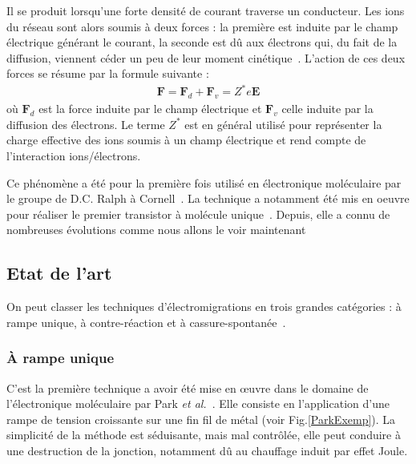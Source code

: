 Il se produit lorsqu'une forte densité de courant traverse un conducteur. Les ions du réseau sont alors soumis à deux forces : la première est induite par le champ électrique générant le courant, la seconde est d\^u aux électrons qui, du fait de la diffusion, viennent céder un peu de leur moment cinétique~\cite{Ho1989}. L'action de ces deux forces se résume par la formule suivante :
\begin{eqnarray}
\textbf{F} = \textbf{F}_d + \textbf{F}_v = Z^*e\textbf{E} \nonumber
\end{eqnarray}
où $\textbf{F}_d$ est la force induite par le champ électrique et $\textbf{F}_v$ celle induite par la diffusion des électrons. Le terme $Z^*$ est en général utilisé pour représenter la charge effective des ions soumis à un champ électrique et rend compte de l'interaction ions/électrons.

Ce phénomène a été pour la première fois utilisé en électronique moléculaire par le groupe de D.C. Ralph à Cornell~\cite{Park1999}. La technique a notamment été mis en oeuvre pour réaliser le premier transistor à molécule unique~\cite{Park2000}. Depuis, elle a connu de nombreuses évolutions comme nous allons le voir maintenant

\subsection{Etat de l'art}
On peut classer les techniques d'électromigrations en trois grandes catégories : à rampe unique, à contre-réaction et à cassure-spontanée~\cite{Girod2012}.

\subsubsection{À rampe unique}
C'est la première technique a avoir été mise en œuvre dans le domaine de l'électronique moléculaire par Park \textit{et al.}~\cite{Park1999}. Elle consiste en l'application d'une rampe de tension croissante sur une fin fil de métal (voir Fig.\ref{ParkExemp}). La simplicité de la méthode est séduisante, mais mal contrôlée, elle peut conduire à une destruction de la jonction, notamment dû au chauffage induit par effet Joule.

